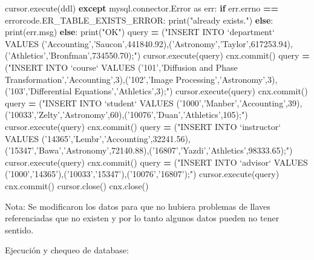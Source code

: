 \documentclass[]{article}
\newenvironment{Shaded}{\begin{snugshade}}{\end{snugshade}}
\newcommand{\StringTok}[1]{\textcolor[rgb]{0.31,0.60,0.02}{#1}}
\newcommand{\ImportTok}[1]{#1}
\newcommand{\ControlFlowTok}[1]{\textcolor[rgb]{0.13,0.29,0.53}{\textbf{#1}}}
\newcommand{\OperatorTok}[1]{\textcolor[rgb]{0.81,0.36,0.00}{\textbf{#1}}}
\newcommand{\BuiltInTok}[1]{#1}
\newcommand{\NormalTok}[1]{#1}
\begin{document}
\begin{Shaded}
\begin{Highlighting}[]
\NormalTok{        cursor.execute(ddl)}
    \ControlFlowTok{except}\NormalTok{ mysql.connector.Error }\ImportTok{as}\NormalTok{ err:}
        \ControlFlowTok{if}\NormalTok{ err.errno }\OperatorTok{==}\NormalTok{ errorcode.ER_TABLE_EXISTS_ERROR:}
            \BuiltInTok{print}\NormalTok{(}\StringTok{"already exists."}\NormalTok{)}
        \ControlFlowTok{else}\NormalTok{:}
            \BuiltInTok{print}\NormalTok{(err.msg)}
    \ControlFlowTok{else}\NormalTok{:}
        \BuiltInTok{print}\NormalTok{(}\StringTok{"OK"}\NormalTok{)}
\NormalTok{query }\OperatorTok{=}\NormalTok{ (}\StringTok{"INSERT INTO `department` VALUES ('Accounting','Saucon',441840.92),('Astronomy','Taylor',617253.94),('Athletics','Bronfman',734550.70);"}\NormalTok{)}
\NormalTok{cursor.execute(query)}
\NormalTok{cnx.commit()}
\NormalTok{query }\OperatorTok{=}\NormalTok{ (}\StringTok{"INSERT INTO `course` VALUES ('101','Diffusion and Phase Transformation','Accounting',3),('102','Image Processing','Astronomy',3),('103','Differential Equations','Athletics',3);"}\NormalTok{)}
\NormalTok{cursor.execute(query)}
\NormalTok{cnx.commit()}
\NormalTok{query }\OperatorTok{=}\NormalTok{ (}\StringTok{"INSERT INTO `student` VALUES ('1000','Manber','Accounting',39),('10033','Zelty','Astronomy',60),('10076','Duan','Athletics',105);"}\NormalTok{)}
\NormalTok{cursor.execute(query)}
\NormalTok{cnx.commit()}
\NormalTok{query }\OperatorTok{=}\NormalTok{ (}\StringTok{"INSERT INTO `instructor` VALUES ('14365','Lembr','Accounting',32241.56),('15347','Bawa','Astronomy',72140.88),('16807','Yazdi','Athletics',98333.65);"}\NormalTok{)}
\NormalTok{cursor.execute(query)}
\NormalTok{cnx.commit()}
\NormalTok{query }\OperatorTok{=}\NormalTok{ (}\StringTok{"INSERT INTO `advisor` VALUES ('1000','14365'),('10033','15347'),('10076','16807');"}\NormalTok{)}
\NormalTok{cursor.execute(query)}
\NormalTok{cnx.commit()}
\NormalTok{cursor.close()}
\NormalTok{cnx.close()}
\end{Highlighting}
\end{Shaded}

Nota: Se modificaron los datos para que no hubiera problemas de llaves
referenciadas que no existen y por lo tanto algunos datos pueden no
tener sentido.

Ejecución y chequeo de database:
\end{document}
